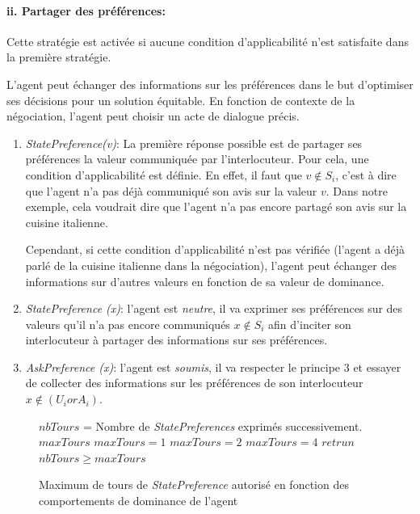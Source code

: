			
		\paragraph{ii. Partager des préférences:} Cette stratégie est activée si aucune condition d'applicabilité n'est satisfaite dans la première stratégie. 
		
		L'agent peut échanger des informations sur les préférences dans le but d'optimiser ses décisions pour un solution équitable. En fonction de contexte de la négociation, l'agent peut choisir un acte de dialogue précis.
		
		\begin{enumerate}     
			\item \emph{StatePreference(v)}: La première réponse possible est de partager ses préférences la valeur communiquée par l'interlocuteur. Pour cela, une condition d'applicabilité est définie. En effet, il faut que $v \notin S_i$, c'est à dire que l'agent n'a pas déjà communiqué son avis sur la valeur $v$. Dans notre exemple, cela voudrait dire que l'agent n'a pas encore partagé son avis sur la cuisine italienne.
			
			Cependant, si cette condition d'applicabilité n'est pas vérifiée (l'agent a déjà parlé de la cuisine italienne dans la négociation), l'agent peut échanger des informations sur d'autres valeurs en fonction de sa valeur de dominance. 
			
			\item \emph{StatePreference (x)}: l'agent est \emph{neutre}, il va exprimer ses préférences sur des valeurs qu'il n'a pas encore communiqués $x \notin S_i$ afin d'inciter son interlocuteur à partager des informations sur ses préférences.
			
			\item \emph{AskPreference (x)}: l'agent est \emph{soumis}, il va respecter le principe 3 et essayer de collecter des informations sur les préférences de son interlocuteur $x \not \in (U_i or A_i)$.
			
		\end{enumerate}  
		
	
	\begin{figure}[t]
		\caption{\label{alg:maxtours} Maximum de tours de \emph{StatePreference} autorisé en fonction des comportements de dominance de l'agent}
		\begin{algorithmic}[1]
			\State $nbTours$ = Nombre de \emph{StatePreferences} exprimés successivement.
			\State $maxTours$ 
			\State $maxTours = 1$
			\EndIf
			 \State $maxTours = 2$
			\EndIf
			\State $maxTours = 4$
			\EndIf
			\State $retrun$ $nbTours\geq maxTours$
			\EndFunction
		\end{algorithmic}
	\end{figure} 
	
